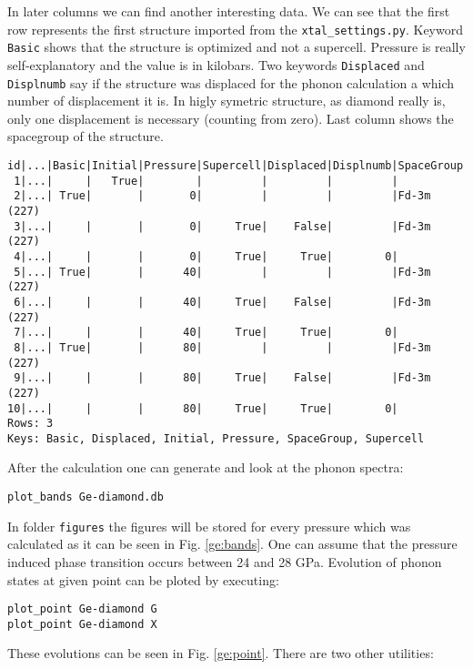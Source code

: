 \documentclass[12pt]{article}
\begin{document}
In later columns we can find another interesting data. We can see that the first row represents the first structure imported from the \texttt{xtal\_settings.py}. Keyword \texttt{Basic} shows that the structure is optimized and not a supercell. Pressure is really self-explanatory and the value is in kilobars. Two keywords \texttt{Displaced} and \texttt{Displnumb} say if the structure was displaced for the phonon calculation a which number of displacement it is. In higly symetric structure, as diamond really is, only one displacement is necessary (counting from zero). Last column shows the spacegroup of the structure.

\begin{verbatim}
id|...|Basic|Initial|Pressure|Supercell|Displaced|Displnumb|SpaceGroup
 1|...|     |   True|        |         |         |         |           
 2|...| True|       |       0|         |         |         |Fd-3m (227)
 3|...|     |       |       0|     True|    False|         |Fd-3m (227)
 4|...|     |       |       0|     True|     True|        0|           
 5|...| True|       |      40|         |         |         |Fd-3m (227)
 6|...|     |       |      40|     True|    False|         |Fd-3m (227)
 7|...|     |       |      40|     True|     True|        0|           
 8|...| True|       |      80|         |         |         |Fd-3m (227)
 9|...|     |       |      80|     True|    False|         |Fd-3m (227)
10|...|     |       |      80|     True|     True|        0|           
Rows: 3
Keys: Basic, Displaced, Initial, Pressure, SpaceGroup, Supercell

\end{verbatim}

After the calculation one can generate and look at the phonon spectra:

\begin{verbatim}
plot_bands Ge-diamond.db
\end{verbatim}

In folder \texttt{figures} the figures will be stored for every pressure which was calculated as it can be seen in Fig. \ref{ge:bands}. One can assume that the pressure induced phase transition occurs between 24 and 28 GPa. Evolution of phonon states at given point can be ploted by executing:

\begin{verbatim}
plot_point Ge-diamond G
plot_point Ge-diamond X
\end{verbatim}

These evolutions can be seen in Fig. \ref{ge:point}. There are two other utilities:
\end{document}
